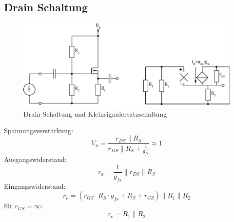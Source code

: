 



\subsection{Drain Schaltung}
\begin{figure}[h!]
	\centering
	\includegraphics[width = \linewidth]{fet_drain.pdf}
	\caption{Drain Schaltung und Kleinsignalersatzschaltung}
	\label{fet:drainschaltung}
\end{figure}
\noindent
Spannungsverstärkung:
\[
	V_u = \frac{r_{DS} \parallel R_S}{r_{DS} \parallel R_S + \frac{1}{g_{fs}}} \approx 1
\]
Ausgangswiderstand:
\[
	r_a = \frac{1}{g_{fs}} \parallel r_{DS} \parallel R_S
\]
Eingangswiderstand:
\[
	r_e = (r_{GS} \cdot R_S \cdot g_{fs} + R_S + r_{GS}) \parallel R_1 \parallel R_2
\]
für $r_{GS} = \infty$:
\[
	r_e = R_1 \parallel R_2
\]